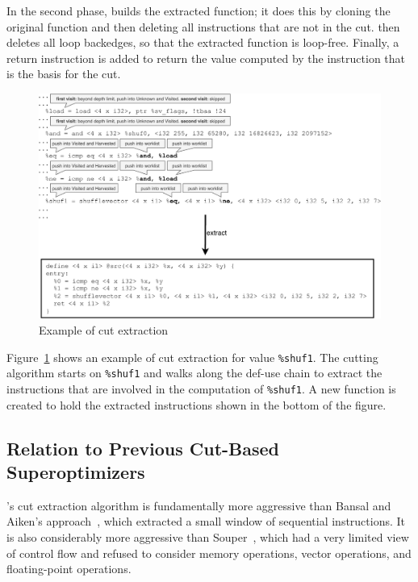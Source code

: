 In the second phase, \minotaur{} builds the extracted function; it does
this by cloning the original function and then deleting all
instructions that are not in the cut.
%
\minotaur{} then deletes all loop backedges, so that the extracted
function is loop-free.
%
Finally, a return instruction is added to return the value computed by
the instruction that is the basis for the cut.

\begin{figure}[tbp]
  \centering
  \includegraphics[width=0.8\linewidth]{figures/slice.pdf}
  \caption{Example of cut extraction}
  \label{fig:cut}
\end{figure}


Figure~\ref{fig:cut} shows an example of cut extraction
for value \texttt{\%shuf1}.
%
The cutting algorithm starts on \texttt{\%shuf1} and walks along the
def-use chain to extract the instructions that are involved in the
computation of \texttt{\%shuf1}.
%
A new function is created to hold the extracted instructions shown
in the bottom of the figure.



\subsection{Relation to Previous Cut-Based Superoptimizers}

\minotaur's cut extraction algorithm is fundamentally more aggressive
than Bansal and Aiken's approach~\cite{Bansal06}, which extracted a
small window of sequential instructions.
%
It is also considerably more aggressive than Souper~\cite{souper},
which had a very limited view of control flow and refused to consider
memory operations, vector operations, and floating-point operations.